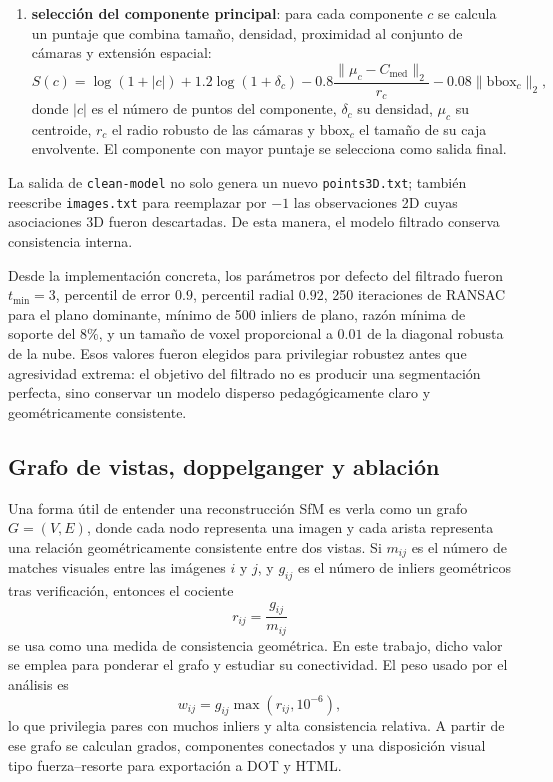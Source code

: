 \documentclass[conference]{IEEEtran}
\begin{document}
\begin{enumerate}
  \item \textbf{selecci\'on del componente principal}: para cada componente \(c\) se calcula un puntaje que combina tama\~no, densidad, proximidad al conjunto de c\'amaras y extensi\'on espacial:
  \begin{equation}
  S(c) =
  \log(1+|c|)
  + 1.2 \log(1+\delta_c)
  - 0.8 \frac{\| \mu_c - C_{\text{med}} \|_2}{r_c}
  - 0.08 \|\mathrm{bbox}_c\|_2,
  \end{equation}
  donde \(|c|\) es el n\'umero de puntos del componente, \(\delta_c\) su densidad, \(\mu_c\) su centroide, \(r_c\) el radio robusto de las c\'amaras y \(\mathrm{bbox}_c\) el tama\~no de su caja envolvente. El componente con mayor puntaje se selecciona como salida final.
\end{enumerate}

La salida de \texttt{clean-model} no solo genera un nuevo \texttt{points3D.txt}; tambi\'en reescribe \texttt{images.txt} para reemplazar por \(-1\) las observaciones 2D cuyas asociaciones 3D fueron descartadas. De esta manera, el modelo filtrado conserva consistencia interna.

Desde la implementaci\'on concreta, los par\'ametros por defecto del filtrado fueron \(t_{\min}=3\), percentil de error \(0.9\), percentil radial \(0.92\), 250 iteraciones de RANSAC para el plano dominante, m\'inimo de 500 inliers de plano, raz\'on m\'inima de soporte del \(8\%\), y un tama\~no de voxel proporcional a \(0.01\) de la diagonal robusta de la nube. Esos valores fueron elegidos para privilegiar robustez antes que agresividad extrema: el objetivo del filtrado no es producir una segmentaci\'on perfecta, sino conservar un modelo disperso pedag\'ogicamente claro y geom\'etricamente consistente.

\subsection{Grafo de vistas, doppelganger y ablaci\'on}

Una forma \'util de entender una reconstrucci\'on SfM es verla como un grafo \(G=(V,E)\), donde cada nodo representa una imagen y cada arista representa una relaci\'on geom\'etricamente consistente entre dos vistas. Si \(m_{ij}\) es el n\'umero de matches visuales entre las im\'agenes \(i\) y \(j\), y \(g_{ij}\) es el n\'umero de inliers geom\'etricos tras verificaci\'on, entonces el cociente
\begin{equation}
r_{ij} = \frac{g_{ij}}{m_{ij}}
\end{equation}
se usa como una medida de consistencia geom\'etrica. En este trabajo, dicho valor se emplea para ponderar el grafo y estudiar su conectividad. El peso usado por el an\'alisis es
\begin{equation}
w_{ij} = g_{ij}\max(r_{ij}, 10^{-6}),
\end{equation}
lo que privilegia pares con muchos inliers y alta consistencia relativa. A partir de ese grafo se calculan grados, componentes conectados y una disposici\'on visual tipo fuerza--resorte para exportaci\'on a DOT y HTML.
\end{document}
